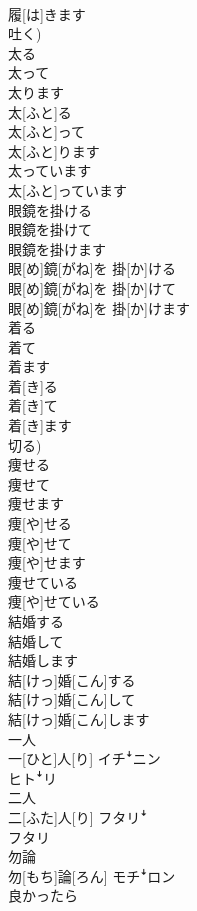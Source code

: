 \documentclass[8pt]{extreport}
\begin{document}
\begin{CJK}{UTF8}{min}
\\	履[は]きます 
\\	吐く)	
\\	太る 
\\	太って 
\\	太ります	
\\	太[ふと]る 
\\	太[ふと]って 
\\	太[ふと]ります	
\\	太っています	
\\	太[ふと]っています	
\\	眼鏡を掛ける 
\\	眼鏡を掛けて 
\\	眼鏡を掛けます	
\\	眼[め]鏡[がね]を 掛[か]ける 
\\	眼[め]鏡[がね]を 掛[か]けて 
\\	眼[め]鏡[がね]を 掛[か]けます	
\\	着る 
\\	着て 
\\	着ます	
\\	着[き]る 
\\	着[き]て 
\\	着[き]ます 
\\	切る)	
\\	痩せる 
\\	痩せて 
\\	痩せます	
\\	痩[や]せる 
\\	痩[や]せて 
\\	痩[や]せます	
\\	痩せている	
\\	痩[や]せている	
\\	結婚する 
\\	結婚して 
\\	結婚します	
\\	結[けっ]婚[こん]する 
\\	結[けっ]婚[こん]して 
\\	結[けっ]婚[こん]します	
\\	一人	
\\	一[ひと]人[り]	イチꜜニン 
\\	ヒトꜜリ
\\	二人	
\\	二[ふた]人[り]	フタリꜜ 
\\	フタリ
\\	勿論	
\\	勿[もち]論[ろん]	モチꜜロン
\\	良かったら	

\end{CJK}
\end{document}
